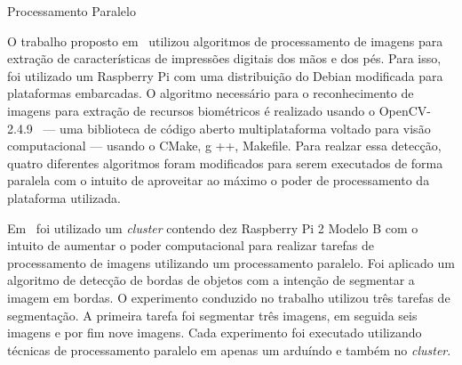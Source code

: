 \begin{subsection}{Processamento Paralelo}

O trabalho proposto em~\cite{Sivaranjani15} utilizou algoritmos de processamento de
imagens para extração de características de impressões digitais dos mãos e dos
pés. Para isso, foi utilizado um Raspberry Pi com uma distribuição do Debian
modificada para plataformas embarcadas. O algoritmo necessário para o
reconhecimento de imagens para extração de recursos biométricos é realizado
usando o OpenCV-2.4.9~\cite{opencv} --- uma biblioteca de código aberto multiplataforma
voltado para visão computacional --- usando o CMake, g ++,
Makefile. Para realzar essa detecção, quatro diferentes algoritmos foram
modificados para serem executados de forma paralela com o intuito de aproveitar
ao máximo o poder de processamento da plataforma utilizada.


Em~\cite{Markovic18} foi utilizado um \textit{cluster} contendo dez Raspberry
Pi 2 Modelo B com o intuito de aumentar o poder computacional
para realizar tarefas de processamento de imagens utilizando um processamento
paralelo. Foi aplicado um algoritmo de detecção de bordas de objetos com a
intenção de segmentar a imagem em bordas. O experimento conduzido no trabalho
utilizou três tarefas de segmentação. A primeira tarefa foi segmentar três
imagens, em seguida seis imagens e por fim nove imagens. Cada experimento foi
executado utilizando técnicas de processamento paralelo em apenas um arduíndo e
também no \textit{cluster}. 


\end{subsection}
